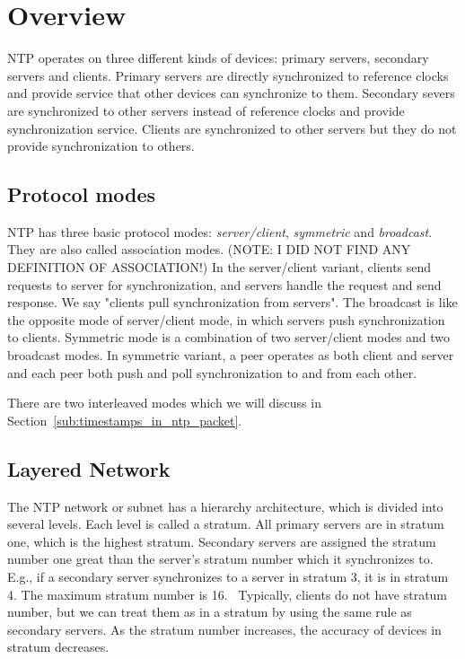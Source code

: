 
\chapter{Overview}
NTP operates on three different kinds of devices: primary servers, secondary
servers and clients. Primary servers are directly synchronized to reference
clocks and provide service that other devices can synchronize to them.
Secondary severs are synchronized to other servers instead of reference clocks
and provide synchronization service. Clients are synchronized to other servers
but they do not provide synchronization to others.

\section{Protocol modes}%
\label{sec:protocol_modes}
NTP has three basic protocol modes: \emph{server/client}, \emph{symmetric}
and \emph{broadcast}. They are also called association modes. (NOTE: I DID NOT
FIND ANY DEFINITION OF ASSOCIATION!) In the server/client variant, clients send
requests to server for synchronization, and servers handle the request and send
response. We say "clients pull synchronization from servers".
The broadcast is like the opposite mode of server/client mode, in which servers
push synchronization to clients. Symmetric mode is a combination of two
server/client modes and two broadcast modes. In symmetric variant, a peer
operates as both client and server and each peer both push and poll
synchronization to and from each other.~\cite{rfc5905}

There are two interleaved modes which we will discuss in
Section~\ref{sub:timestamps_in_ntp_packet}.

\section{Layered Network}
\label{sec:Layered_network}
The NTP network or subnet has a hierarchy architecture, which is divided into
several levels. Each level is called a stratum. All primary servers are in
stratum one, which is the highest stratum. Secondary servers are assigned the
stratum number one great than the server's stratum number which it synchronizes
to. E.g., if a secondary server synchronizes to a server in stratum 3, it is in
stratum 4. The maximum stratum number is 16.~\cite{rfc5905}
Typically, clients do not have stratum number, but we can treat them
as in a stratum by using the same rule as secondary servers.
As the stratum number increases, the accuracy of devices in stratum
decreases.


